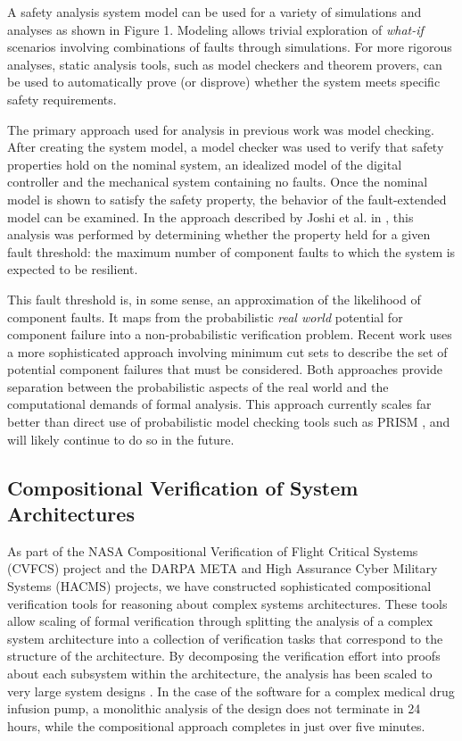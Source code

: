 A safety analysis system model can be used for a variety of simulations and analyses as shown in Figure 1. Modeling allows trivial exploration of \textit{what-if} scenarios involving combinations of faults through simulations. For more rigorous analyses, static analysis tools, such as model checkers and theorem provers, can be used to automatically prove (or disprove) whether the system meets specific safety requirements.

The primary approach used for analysis in previous work was model checking. After creating the system model, a model checker was used to verify that safety properties hold on the nominal system, an idealized model of the digital controller and the mechanical system containing no faults. Once the nominal model is shown to satisfy the safety property, the behavior of the fault-extended model can be examined. In the approach described by Joshi et al. in \cite{Joshi05:Dasc, Joshi05:SafeComp, Joshi07:Hase}, this analysis was performed by determining whether the property held for a given fault threshold: the maximum number of component faults to which the system is expected to be resilient.

This fault threshold is, in some sense, an approximation of the likelihood of component faults. It maps from the probabilistic \textit{real world} potential for component failure into a non-probabilistic verification problem. Recent work \cite{CAV2015:BoCiGrMa} uses a more sophisticated approach involving minimum cut sets to describe the set of potential component failures that must be considered. Both approaches provide separation between the probabilistic aspects of the real world and the computational demands of formal analysis. This approach currently scales far better than direct use of probabilistic model checking tools such as PRISM \cite{CAV2011:KwNoPa}, and will likely continue to do so in the future.

\subsection{Compositional Verification of System Architectures}

As part of the NASA Compositional Verification of Flight Critical Systems (CVFCS) project and the DARPA META and High Assurance Cyber Military Systems (HACMS) projects, we have constructed sophisticated compositional verification tools for reasoning about complex systems architectures. These tools \cite{NFM2012:CoGaMiWhLaLu} allow scaling of formal verification through splitting the analysis of a complex system architecture into a collection of verification tasks that correspond to the structure of the architecture. By decomposing the verification effort into proofs about each subsystem within the architecture, the analysis has been scaled to very large system designs \cite{QFCS15:backes}. In the case of the software for a complex medical drug infusion pump, a monolithic analysis of the design does not terminate in 24 hours, while the compositional approach completes in just over five minutes.

